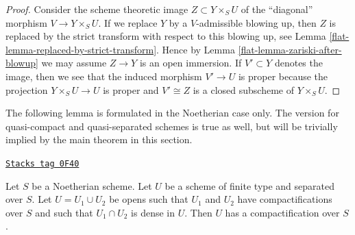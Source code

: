 \begin{proof}

Consider the scheme theoretic image $Z \subset Y \times_S U$
of the ``diagonal'' morphism $V \to Y \times_S U$. If we replace
$Y$ by a $V$-admissible blowing up, then $Z$ is replaced by
the strict transform with respect to this blowing up, see
Lemma \ref{flat-lemma-replaced-by-strict-transform}. Hence by
Lemma \ref{flat-lemma-zariski-after-blowup} we may assume $Z \to Y$
is an open immersion. If $V' \subset Y$ denotes the image, then we
see that the induced morphism $V' \to U$ is proper because the
projection $Y \times_S U \to U$ is proper and $V' \cong Z$
is a closed subscheme of $Y \times_S U$.
\end{proof}

The following lemma is formulated in the Noetherian case only.
The version for quasi-compact and quasi-separated schemes is
true as well, but will be trivially implied by the main
theorem in this section.

\begin{lemma}
\label{flat-lemma-two-compactifications}
\href{https://stacks.math.columbia.edu/tag/0F40}{\texttt{Stacks tag 0F40}}

Let $S$ be a Noetherian scheme. Let $U$ be a scheme of finite type
and separated over $S$. Let $U = U_1 \cup U_2$ be opens such that
$U_1$ and $U_2$ have compactifications over $S$ and such that
$U_1 \cap U_2$ is dense in $U$. Then $U$ has a compactification over $S$.
\end{lemma}

